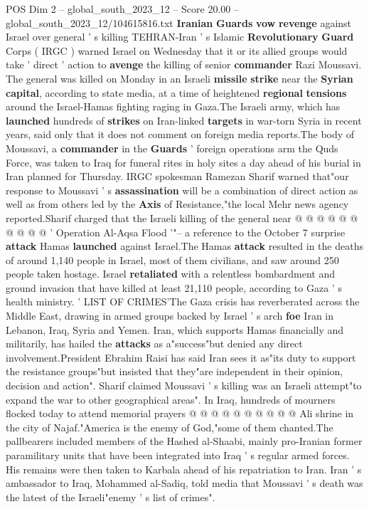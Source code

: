 \begin{textsample}{POS Dim 2 – global\_south\_2023\_12 – Score 20.00 – global\_south\_2023\_12/104615816.txt}  \label{ex:f2_pos_158}
\textbf{Iranian} \textbf{Guards} \textbf{vow} \textbf{revenge} against Israel over general ' s killing TEHRAN-Iran ' s Islamic \textbf{Revolutionary} \textbf{Guard} Corps ( IRGC ) warned Israel on Wednesday that it or its allied groups would take ' direct ' action to \textbf{avenge} the killing of senior \textbf{commander} Razi Moussavi.
The general was killed on Monday in an Israeli \textbf{missile} \textbf{strike} near the \textbf{Syrian} \textbf{capital}, according to state media, at a time of heightened \textbf{regional} \textbf{tensions} around the Israel-Hamas fighting raging in Gaza.The Israeli army, which has \textbf{launched} hundreds of \textbf{strikes} on Iran-linked \textbf{targets} in war-torn Syria in recent years, said only that it does not comment on foreign media reports.The body of Moussavi, a \textbf{commander} in the \textbf{Guards} ' foreign operations arm the Quds Force, was taken to Iraq for funeral rites in holy sites a day ahead of his burial in Iran planned for Thursday.
IRGC spokesman Ramezan Sharif warned that"our response to Moussavi ' s \textbf{assassination} will be a combination of direct action as well as from others led by the \textbf{Axis} of Resistance,"the local Mehr news agency reported.Sharif charged that the Israeli killing of the general near @ @ @ @ @ @ @ @ @ @ ' Operation Al-Aqsa Flood '"-- a reference to the October 7 surprise \textbf{attack} Hamas \textbf{launched} against Israel.The Hamas \textbf{attack} resulted in the deaths of around 1,140 people in Israel, most of them civilians, and saw around 250 people taken hostage.
Israel \textbf{retaliated} with a relentless bombardment and ground invasion that have killed at least 21,110 people, according to Gaza ' s health ministry. ' LIST OF CRIMES'The Gaza crisis has reverberated across the Middle East, drawing in armed groups backed by Israel ' s arch \textbf{foe} Iran in Lebanon, Iraq, Syria and Yemen.
Iran, which supports Hamas financially and militarily, has hailed the \textbf{attacks} as a"success"but denied any direct involvement.President Ebrahim Raisi has said Iran sees it as"its duty to support the resistance groups"but insisted that they"are independent in their opinion, decision and action".
Sharif claimed Moussavi ' s killing was an Israeli attempt"to expand the war to other geographical areas".
In Iraq, hundreds of mourners flocked today to attend memorial prayers @ @ @ @ @ @ @ @ @ @ Ali shrine in the city of Najaf."America is the enemy of God,"some of them chanted.The pallbearers included members of the Hashed al-Shaabi, mainly pro-Iranian former paramilitary units that have been integrated into Iraq ' s regular armed forces.
His remains were then taken to Karbala ahead of his repatriation to Iran.
Iran ' s ambassador to Iraq, Mohammed al-Sadiq, told media that Moussavi ' s death was the latest of the Israeli"enemy ' s list of crimes".

\end{textsample}
